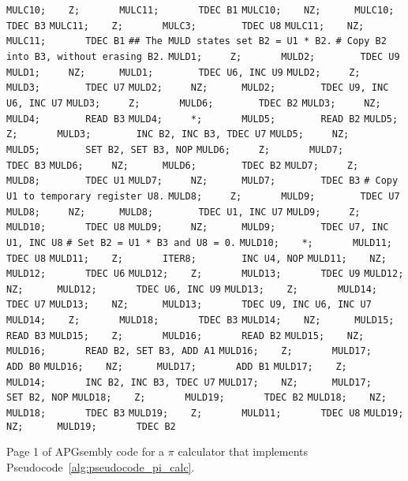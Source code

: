 \begin{apgsembly}
\begin{minipage}[t]{.49\textwidth}
\begin{algorithmic}
			\State \verb|MULC10;    Z;       MULC11;       TDEC B1|
			\State \verb|MULC10;    NZ;      MULC10;       TDEC B3|
			\State \verb|MULC11;    Z;       MULC3;        TDEC U8|
			\State \verb|MULC11;    NZ;      MULC11;       TDEC B1|
			\State \verb||
			\State \verb|## The MULD states set B2 = U1 * B2.|
			\State \verb|# Copy B2 into B3, without erasing B2.|
			\State \verb|MULD1;     Z;       MULD2;        TDEC U9|
			\State \verb|MULD1;     NZ;      MULD1;        TDEC U6, INC U9|
			\State \verb|MULD2;     Z;       MULD3;        TDEC U7|
			\State \verb|MULD2;     NZ;      MULD2;        TDEC U9, INC U6, INC U7|
			\State \verb|MULD3;     Z;       MULD6;        TDEC B2|
			\State \verb|MULD3;     NZ;      MULD4;        READ B3|
			\State \verb|MULD4;     *;       MULD5;        READ B2|
			\State \verb|MULD5;     Z;       MULD3;        INC B2, INC B3, TDEC U7|
			\State \verb|MULD5;     NZ;      MULD5;        SET B2, SET B3, NOP|
			\State \verb|MULD6;     Z;       MULD7;        TDEC B3|
			\State \verb|MULD6;     NZ;      MULD6;        TDEC B2|
			\State \verb|MULD7;     Z;       MULD8;        TDEC U1|
			\State \verb|MULD7;     NZ;      MULD7;        TDEC B3|
			\State \verb||
			\State \verb|# Copy U1 to temporary register U8.|
			\State \verb|MULD8;     Z;       MULD9;        TDEC U7|
			\State \verb|MULD8;     NZ;      MULD8;        TDEC U1, INC U7|
			\State \verb|MULD9;     Z;       MULD10;       TDEC U8|
			\State \verb|MULD9;     NZ;      MULD9;        TDEC U7, INC U1, INC U8|
			\State \verb||
			\State \verb|# Set B2 = U1 * B3 and U8 = 0.|
			\State \verb|MULD10;    *;       MULD11;       TDEC U8|
			\State \verb|MULD11;    Z;       ITER8;        INC U4, NOP|
			\State \verb|MULD11;    NZ;      MULD12;       TDEC U6|
			\State \verb|MULD12;    Z;       MULD13;       TDEC U9|
			\State \verb|MULD12;    NZ;      MULD12;       TDEC U6, INC U9|
			\State \verb|MULD13;    Z;       MULD14;       TDEC U7|
			\State \verb|MULD13;    NZ;      MULD13;       TDEC U9, INC U6, INC U7|
			\State \verb|MULD14;    Z;       MULD18;       TDEC B3|
			\State \verb|MULD14;    NZ;      MULD15;       READ B3|
			\State \verb|MULD15;    Z;       MULD16;       READ B2|
			\State \verb|MULD15;    NZ;      MULD16;       READ B2, SET B3, ADD A1|
			\State \verb|MULD16;    Z;       MULD17;       ADD B0|
			\State \verb|MULD16;    NZ;      MULD17;       ADD B1|
			\State \verb|MULD17;    Z;       MULD14;       INC B2, INC B3, TDEC U7|
			\State \verb|MULD17;    NZ;      MULD17;       SET B2, NOP|
			\State \verb|MULD18;    Z;       MULD19;       TDEC B2|
			\State \verb|MULD18;    NZ;      MULD18;       TDEC B3|
			\State \verb|MULD19;    Z;       MULD11;       TDEC U8|
			\State \verb|MULD19;    NZ;      MULD19;       TDEC B2|
		\end{algorithmic}
	\end{minipage}
	\caption{Page 1 of APGsembly code for a $\pi$ calculator that implements Pseudocode~\ref{alg:pseudocode_pi_calc}.}\label{alg:apgsembly_pi1}
\end{apgsembly}

